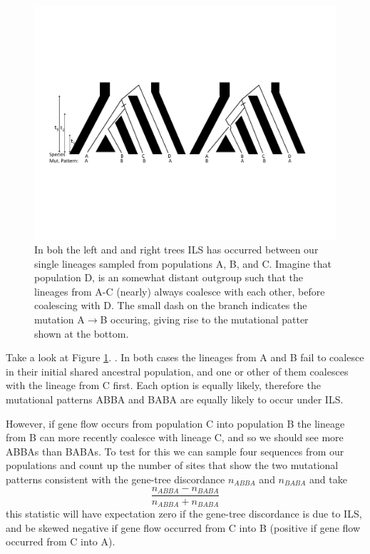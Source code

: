 \begin{figure}
\begin{center}
\includegraphics[width=\textwidth]{figures/Genetic_drift/ILS/ABBA_BABA_coal.pdf}
\end{center}
\caption{ In boh the left and and right trees ILS has occurred between our single lineages sampled from populations A, B, and C. Imagine that population D, is an somewhat distant outgroup
such that the lineages from A-C (nearly) always coalesce with each
other, before coalescing with D. The small dash on the branch
indicates the mutation A$\rightarrow$B occuring, giving rise to the
mutational patter shown at the bottom. } \label{fig:ABBA_BABA} 
\end{figure}

Take a look at Figure \ref{fig:ABBA_BABA}. . In both cases the lineages from A and B fail to coalesce in
their initial shared ancestral population, and one or other of them
coalesces with the lineage from C first. Each option is equally
likely, therefore the mutational patterns ABBA and BABA are equally
likely to occur under ILS.  

However, if gene flow occurs from population C into population B the
lineage from B can more recently coalesce with lineage C, and so we
should see more ABBAs than BABAs. To test for this we can sample four
sequences from our populations and count up the number of sites that
show the two mutational patterns consistent with the gene-tree discordance $n_{ABBA}$ and
$n_{BABA}$ and take 
\begin{equation}
\frac{n_{ABBA}-n_{BABA}}{n_{ABBA}+n_{BABA}}
\end{equation}
this statistic will have expectation zero if the gene-tree discordance
is due to ILS, and be skewed negative if gene flow
occurred from C into B (positive if gene flow occurred from C into A).

